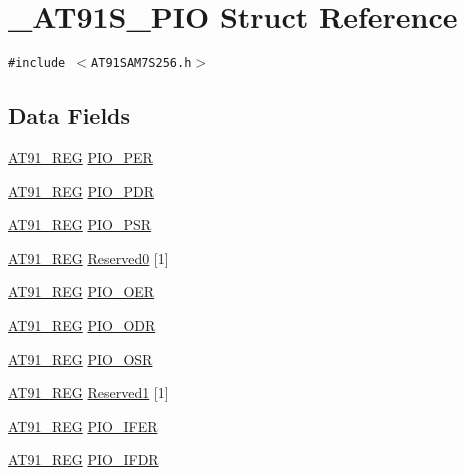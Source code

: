 \hypertarget{struct__AT91S__PIO}{
\section{\_\-AT91S\_\-PIO Struct Reference}
\label{struct__AT91S__PIO}
}
{\tt \#include $<$AT91SAM7S256.h$>$}

\subsection*{Data Fields}
\begin{CompactItemize}
\item 
\hyperlink{AT91SAM7X256_8h_712ad5a1ac1bd02f3e95a7526c283ce1}{AT91\_\-REG} \hyperlink{struct__AT91S__PIO_6219ff0520bc90a0c1eef988bd253d48}{PIO\_\-PER}
\item 
\hyperlink{AT91SAM7X256_8h_712ad5a1ac1bd02f3e95a7526c283ce1}{AT91\_\-REG} \hyperlink{struct__AT91S__PIO_1562c48486ffd8abe50d80ae6c37ec8f}{PIO\_\-PDR}
\item 
\hyperlink{AT91SAM7X256_8h_712ad5a1ac1bd02f3e95a7526c283ce1}{AT91\_\-REG} \hyperlink{struct__AT91S__PIO_05c0cb31a5592c29fc2e499463be3184}{PIO\_\-PSR}
\item 
\hyperlink{AT91SAM7X256_8h_712ad5a1ac1bd02f3e95a7526c283ce1}{AT91\_\-REG} \hyperlink{struct__AT91S__PIO_04904720c11b78e63134fadf6a71f4fc}{Reserved0} \mbox{[}1\mbox{]}
\item 
\hyperlink{AT91SAM7X256_8h_712ad5a1ac1bd02f3e95a7526c283ce1}{AT91\_\-REG} \hyperlink{struct__AT91S__PIO_d98a2d712fd626ab4e7f4a03a67b92a3}{PIO\_\-OER}
\item 
\hyperlink{AT91SAM7X256_8h_712ad5a1ac1bd02f3e95a7526c283ce1}{AT91\_\-REG} \hyperlink{struct__AT91S__PIO_7994c9c78ecec3f0793d60c6e7701d5d}{PIO\_\-ODR}
\item 
\hyperlink{AT91SAM7X256_8h_712ad5a1ac1bd02f3e95a7526c283ce1}{AT91\_\-REG} \hyperlink{struct__AT91S__PIO_104b2e81a10a1fc02b327bf9ec570d23}{PIO\_\-OSR}
\item 
\hyperlink{AT91SAM7X256_8h_712ad5a1ac1bd02f3e95a7526c283ce1}{AT91\_\-REG} \hyperlink{struct__AT91S__PIO_8d0eed279cd1fcc9d0d9d22e5f6e4d15}{Reserved1} \mbox{[}1\mbox{]}
\item 
\hyperlink{AT91SAM7X256_8h_712ad5a1ac1bd02f3e95a7526c283ce1}{AT91\_\-REG} \hyperlink{struct__AT91S__PIO_7e7a1da05d277f207aed36d54ffb9544}{PIO\_\-IFER}
\item 
\hyperlink{AT91SAM7X256_8h_712ad5a1ac1bd02f3e95a7526c283ce1}{AT91\_\-REG} \hyperlink{struct__AT91S__PIO_6158e1b4b35b79e063382033b525df3b}{PIO\_\-IFDR}

\end{CompactItemize}
